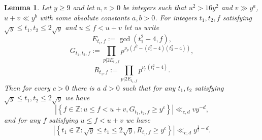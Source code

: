 \documentclass[12pt]{amsart}
\newtheorem{lemma}[theorem]{Lemma}
\theoremstyle{definition}
\numberwithin{equation}{section}
\begin{document}
\begin{lemma}\label{lem:7,5}
Let $y\ge 9$ and let $u,v>0$ be integers such that
$u^2>16y^2$ and $v\gg y^a$, $u+v\ll y^b$ with some absolute
constants $a,b>0$. For integers $t_1,t_2,f$ satisfying
$\sqrt {y}\le t_1,t_2\le 2\sqrt {y}$ and $u\le f<u+v$ let us write
\[E_{t_1,f}:=\gcd\left(t_1^2-4,f\right),\]
\begin{equation}G_{t_1,t_2,f}:=\prod_{p|2E_{t_1,f}}p^{\nu_p\left(
f^2-\left(t_1^2-4\right)\left(t_2^2-4\right)\right)},\label{222}\end{equation}
\[R_{t_1,f}:=\prod_{p|2E_{t_1,f}}p^{\nu_p\left(t_1^2-4\right)}.\]
Then for every $c>0$ there is a $d>0$ such that for any $t_1,t_2$ satisfying
$\sqrt {y}\le t_1,t_2\le 2\sqrt {y}$ we have
\begin{equation}\left|\left\{f\in\mathbb{Z}:u\le f<u+v,G_{t_1,t_2
,f}\ge y^c\right\}\right|\ll_{c,d}vy^{-d},\label{74}\end{equation}
and for any $f$ satisfying $u\le f<u+v$ we have
\begin{equation}\left|\left\{t_1\in\mathbb{Z}:\sqrt {y}\le t_1\le
2\sqrt {y},R_{t_1,f}\ge y^c\right\}\right|\ll_{c,d}y^{\frac 12-d}
.\label{75}\end{equation}
\end{lemma}
\end{document}

